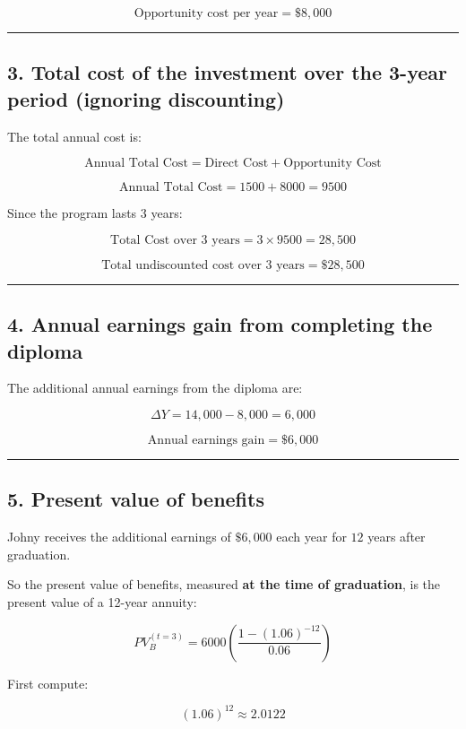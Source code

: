 \documentclass[12pt]{article}
\begin{document}
\[
\boxed{\text{Opportunity cost per year} = \$8{,}000}
\]

\hrule
\vspace{0.5em}

\subsection*{3. Total cost of the investment over the 3-year period (ignoring discounting)}

The total annual cost is:

\[
\text{Annual Total Cost} = \text{Direct Cost} + \text{Opportunity Cost}
\]

\[
\text{Annual Total Cost} = 1500 + 8000 = 9500
\]

Since the program lasts 3 years:

\[
\text{Total Cost over 3 years} = 3 \times 9500 = 28{,}500
\]

\[
\boxed{\text{Total undiscounted cost over 3 years} = \$28{,}500}
\]

\hrule
\vspace{0.5em}

\subsection*{4. Annual earnings gain from completing the diploma}

The additional annual earnings from the diploma are:

\[
\Delta Y = 14{,}000 - 8{,}000 = 6{,}000
\]

\[
\boxed{\text{Annual earnings gain} = \$6{,}000}
\]

\hrule
\vspace{0.5em}

\subsection*{5. Present value of benefits}

Johny receives the additional earnings of \(\$6{,}000\) each year for \(12\) years after graduation.

So the present value of benefits, measured \textbf{at the time of graduation}, is the present value of a 12-year annuity:

\[
PV_B^{(t=3)} = 6000 \left( \frac{1-(1.06)^{-12}}{0.06} \right)
\]

First compute:

\[
(1.06)^{12} \approx 2.0122
\]
\end{document}
